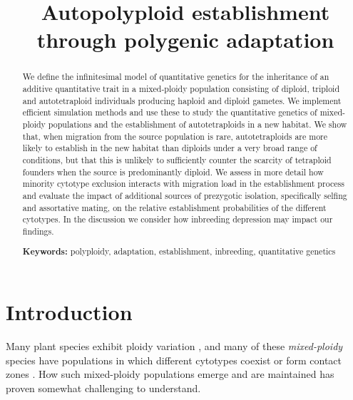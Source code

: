 \documentclass[12pt,a4paper]{article}
\begin{document}
\title{Autopolyploid establishment through polygenic adaptation}
\author{}
\date{\vspace{-5ex}}
\maketitle
\begin{abstract}
We define the infinitesimal model of quantitative genetics for the inheritance
    of an additive quantitative trait in a mixed-ploidy population consisting
    of diploid, triploid and autotetraploid individuals producing haploid and
    diploid gametes.
    We implement efficient simulation methods and use these to study the
    quantitative genetics of mixed-ploidy populations and the establishment of
    autotetraploids in a new habitat.
    We show that, when migration from the source population is rare,
    autotetraploids are more likely to establish in the new habitat 
    than diploids under a very broad range of conditions, but that this
    is unlikely to sufficiently counter the scarcity of tetraploid founders
    when the source is predominantly diploid.
    We assess in more detail how minority cytotype exclusion interacts with
    migration load in the establishment process and evaluate the impact of
    additional sources of prezygotic isolation, specifically selfing and
    assortative mating, on the relative establishment probabilities of the
    different cytotypes.
    In the discussion we consider how inbreeding depression may impact our
    findings.

    \textbf{Keywords:} polyploidy, adaptation, establishment, inbreeding,
    quantitative genetics 
\end{abstract}

\section*{Introduction}

Many plant species exhibit ploidy variation
\citep{levin2002,soltis2007,rice2015}, and many of these \textit{mixed-ploidy}
species have populations in which different cytotypes coexist or form contact
zones \citep{kolar2017}.
How such mixed-ploidy populations emerge and are maintained has proven somewhat
challenging to understand.
\end{document}
